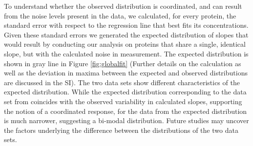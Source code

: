 To understand whether the observed distribution is coordinated, and can result from the noise levels present in the data, we calculated, for every protein, the standard error with respect to the regression line that best fits its concentrations.
Given these standard errors we generated the expected distribution of slopes that would result by conducting our analysis on proteins that share a single, identical slope, but with the calculated noise in measurement.
The expected distribution is shown in gray line in Figure \ref{fig:globalfit} (Further details on the calculation as well as the deviation in maxima between the expected and observed distributions are discussed in the SI).
The two data sets show different characteristics of the expected distribution.
While the expected distribution corresponding to the data set from \cite{Heinemann2015} coincides with the observed variability in calculated slopes, supporting the notion of a coordinated response, for the data from \cite{Valgepea2013} the expected distribution is much narrower, suggesting a bi-modal distribution.
Future studies may uncover the factors underlying the difference between the distributions of the two data sets.